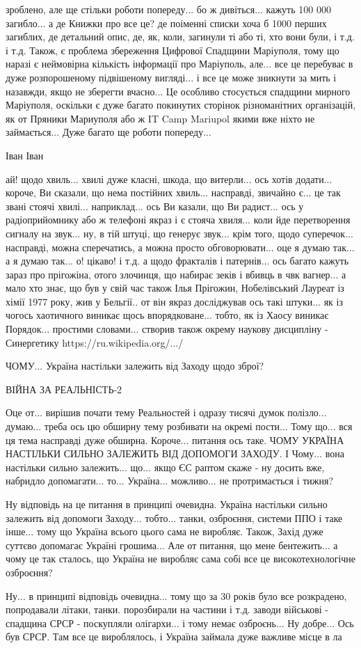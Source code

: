 зроблено, але ще стільки роботи попереду... бо ж дивіться... кажуть 100 000
загибло... а де Книжки про все це? де поіменні списки хоча б 1000 перших
загиблих, де детальний опис, де, як, коли, загинули ті або ті, хто вони були, і
т.д. і т.д. Також, є проблема збереження Цифрової Спадщини Маріуполя, тому що
наразі є неймовірна кількість інформації про Маріуполь, але... все це перебуває
в дуже розпорошеному підвішеному вигляді... і все це може зникнути за мить і
назавжди, якщо не зберегти вчасно... Це особливо стосується спадщини мирного
Маріуполя, оскільки є дуже багато покинутих сторінок різноманітних організацій,
як от Пряники Мариуполя або ж IT Camp Mariupol якими вже ніхто не займається...
Дуже багато ще роботи попереду...

Іван Іван

ай! щодо хвиль... хвилі дуже класні, шкода, що витерли... ось хотів додати...
короче, Ви сказали, що нема постійних хвиль... насправді, звичайно є... це так
звані стоячі хвилі... наприклад... ось Ви казали, що Ви радист... ось у
радіоприйомнику або ж телефоні якраз і є стояча хвиля... коли йде перетворення
сигналу на звук... ну, в тій штуці, що генерує звук... крім того, щодо
суперечок... насправді, можна сперечатись, а можна просто обговорювати... оце я
думаю так... а я думаю так... о! цікаво! і т.д. а щодо фракталів і патернів...
ось багато кажуть зараз про прігожіна, отого злочинця, що набирає зеків і
вбивць в чвк вагнер... а мало хто знає, що був у свій час також Ілья Прігожин,
Нобелівський Лауреат із хімії 1977 року, жив у Бельгії.. от він якраз
досліджував ось такі штуки... як із чогось хаотичного виникає щось
впорядковане... тобто, як із Хаосу виникає Порядок... простими словами...
створив також окрему наукову дисципліну - Синергетику
https://ru.wikipedia.org/.../%

ЧОМУ... Україна настільки залежить від Заходу щодо зброї?

ВІЙНА ЗА РЕАЛЬНІСТЬ-2

Оце от... вирішив почати тему Реальностей і одразу тисячі думок полізло...
думаю... треба ось цю обширну тему розбивати на окремі пости... Тому що... вся
ця тема насправді дуже обширна. Короче... питання ось таке. ЧОМУ УКРАЇНА
НАСТІЛЬКИ СИЛЬНО ЗАЛЕЖИТЬ ВІД ДОПОМОГИ ЗАХОДУ. І Чому... вона настільки сильно
залежить... що... якщо ЄС раптом скаже - ну досить вже, набридло допомагати...
то... Україна... можливо... не протримається і тижня?  

Ну відповідь на це питання в принципі очевидна. Україна настільки сильно
залежить від допомоги Заходу... тобто... танки, озброєння, системи ППО і таке
інше... тому що Україна всього цього сама не виробляє. Також, Захід дуже
суттєво допомагає Україні грошима... Але от питання, що мене бентежить... а
чому це так сталось, що Україна не виробляє сама собі все це високотехнологічне
озброєння?

Ну... в принципі відповідь очевидна... тому що за 30 років було все розкрадено,
попродавали літаки, танки. порозбирали на частини і т.д. заводи військові -
спадщина СРСР - поскупляли олігархи... і тому немає озброєнь... Ну добре... Ось
був СРСР.  Там все це вироблялось, і Україна займала дуже важливе місце в ла




